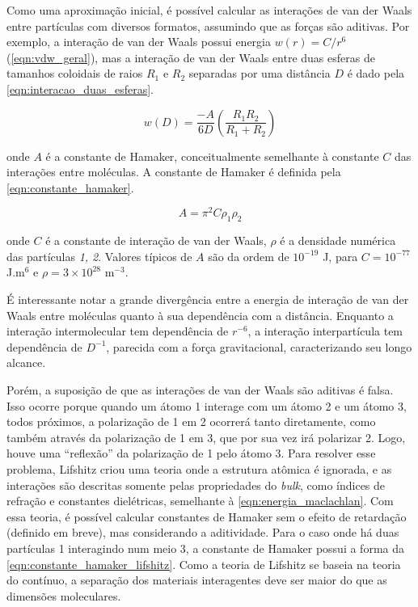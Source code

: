	Como uma aproximação inicial, é possível calcular as interações de van der Waals entre partículas com diversos formatos, assumindo que as forças são aditivas. Por exemplo, a interação de van der Waals possui energia \(w(r) = C/r^6\) (\autoref{eqn:vdw_geral}), mas a interação de van der Waals entre duas esferas de tamanhos coloidais de raios \(R_1\) e \(R_2\) separadas por uma distância \(D\) é dado pela \autoref{eqn:interacao_duas_esferas}. 
	
	\begin{equation}
		w(D) = \dfrac{-A}{6D} \left( \dfrac{R_1R_2}{R_1 + R_2}   \right)
		\label{eqn:interacao_duas_esferas}
	\end{equation}
	
	\noindent onde \(A\) é a constante de Hamaker, conceitualmente semelhante à constante \(C\) das interações entre moléculas. A constante de Hamaker é definida pela \autoref{eqn:constante_hamaker}. 
	
	\begin{equation}
		A = \pi^2 C \rho_1 \rho_2
		\label{eqn:constante_hamaker}
	\end{equation}
	
	\noindent onde \(C\) é a constante de interação de van der Waals, \(\rho\) é a densidade numérica das partículas \emph{1, 2}. Valores típicos de \(A\) são da ordem de \(10^{-19}\) J, para \(C = 10^{-77}\) J.m\(^6\) e \(\rho=3 \times 10^{28}\) m\(^{-3}\).
	
	É interessante notar a grande divergência entre a energia de interação de van der Waals entre moléculas quanto à sua dependência com a distância. Enquanto a interação intermolecular tem dependência de \(r^{-6}\), a interação interpartícula tem dependência de \(D^{-1}\), parecida com a força gravitacional, caracterizando seu longo alcance.

	Porém, a suposição de que as interações de van der Waals são aditivas é falsa. Isso ocorre porque quando um átomo 1 interage com um átomo 2 e um átomo 3, todos próximos, a polarização de 1 em 2 ocorrerá tanto diretamente, como também através da polarização de 1 em 3, que por sua vez irá polarizar 2. Logo, houve uma ``reflexão'' da polarização de 1 pelo átomo 3. Para resolver esse problema, Lifshitz  criou uma teoria onde a estrutura atômica é ignorada, e as interações são descritas somente pelas propriedades do \emph{bulk}, como índices de refração e constantes dielétricas, semelhante à \autoref{eqn:energia_maclachlan}. Com essa teoria, é possível calcular constantes de Hamaker sem o efeito de retardação (definido em breve), mas considerando a aditividade. Para o caso onde há duas partículas 1 interagindo num meio 3, a constante de Hamaker possui a forma da \autoref{eqn:constante_hamaker_lifshitz}. Como a teoria de Lifshitz se baseia na teoria do contínuo, a separação dos materiais interagentes deve ser maior do que as dimensões moleculares.
	
